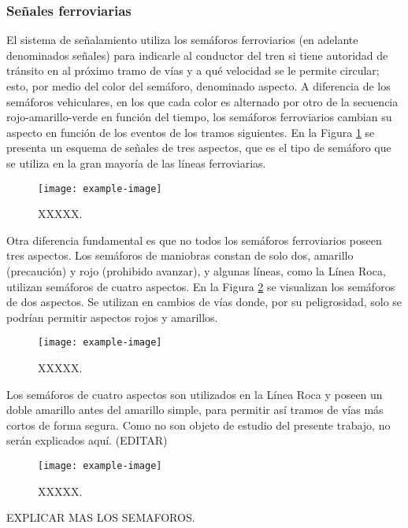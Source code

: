 \subsubsection{Señales ferroviarias}

El sistema de señalamiento utiliza los semáforos ferroviarios (en adelante denominados señales) para indicarle al conductor del tren si tiene autoridad de tránsito en al próximo tramo de vías y a qué velocidad se le permite circular; esto, por medio del color del semáforo, denominado aspecto. A diferencia de los semáforos vehiculares, en los que cada color es alternado por otro de la secuencia rojo-amarillo-verde en función del tiempo, los semáforos ferroviarios cambian su aspecto en función de los eventos de los tramos siguientes. En la Figura \ref{fig:signal_1} se presenta un esquema de señales de tres aspectos, que es el tipo de semáforo que se utiliza en la gran mayoría de las líneas ferroviarias.

    \begin{figure}[h]
        \centering
        \texttt{[image: example-image]}
        \centering\caption{XXXXX.}
        \label{fig:signal_1}
    \end{figure}

Otra diferencia fundamental es que no todos los semáforos ferroviarios poseen tres aspectos. Los semáforos de maniobras constan de solo dos, amarillo (precaución) y rojo (prohibido avanzar), y algunas líneas, como la Línea Roca, utilizan semáforos de cuatro aspectos. En la Figura \ref{fig:signal_2} se visualizan los semáforos de dos aspectos. Se utilizan en cambios de vías donde, por su peligrosidad, solo se podrían permitir aspectos rojos y amarillos.

    \begin{figure}[h]
        \centering
        \texttt{[image: example-image]}
        \centering\caption{XXXXX.}
        \label{fig:signal_2}
    \end{figure}

Los semáforos de cuatro aspectos son utilizados en la Línea Roca y poseen un doble amarillo antes del amarillo simple, para permitir así tramos de vías más cortos de forma segura. Como no son objeto de estudio del presente trabajo, no serán explicados aquí. (EDITAR)

    \begin{figure}[h]
        \centering
        \texttt{[image: example-image]}
        \centering\caption{XXXXX.}
        \label{fig:signal_3}
    \end{figure}

EXPLICAR MAS LOS SEMAFOROS.